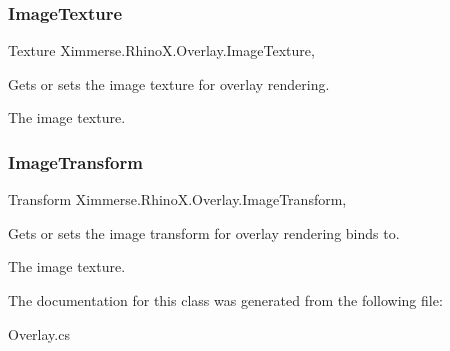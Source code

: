 \subsubsection{\texorpdfstring{Image\+Texture}{ImageTexture}}
{\footnotesize\ttfamily Texture Ximmerse.\+Rhino\+X.\+Overlay.\+Image\+Texture\hspace{0.3cm}{\ttfamily [get]}, {\ttfamily [set]}}



Gets or sets the image texture for overlay rendering. 

The image texture.\mbox{\label{class_ximmerse_1_1_rhino_x_1_1_overlay_a146fe73ef50033f83d4eac7354dded8e}} 
\subsubsection{\texorpdfstring{Image\+Transform}{ImageTransform}}
{\footnotesize\ttfamily Transform Ximmerse.\+Rhino\+X.\+Overlay.\+Image\+Transform\hspace{0.3cm}{\ttfamily [get]}, {\ttfamily [set]}}



Gets or sets the image transform for overlay rendering binds to. 

The image texture.

The documentation for this class was generated from the following file\+:\begin{DoxyCompactItemize}
\item 
Overlay.\+cs\end{DoxyCompactItemize}
